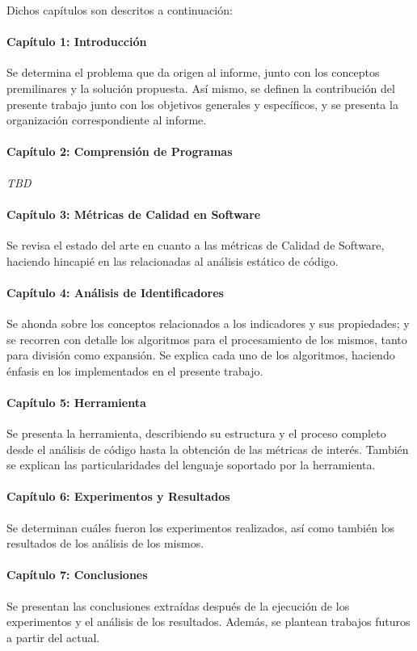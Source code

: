 Dichos capítulos son descritos a continuación:

\paragraph[]{Capítulo 1: Introducción} Se determina el problema que da origen al informe,
junto con los conceptos premilinares y la solución propuesta.
Así mismo, se definen la contribución del presente trabajo junto con los objetivos generales
y específicos, y se presenta la organización correspondiente al informe.

\paragraph[]{Capítulo 2: Comprensión de Programas} \textit{TBD}

\paragraph[]{Capítulo 3: Métricas de Calidad en Software} Se revisa el estado del arte
en cuanto a las métricas de Calidad de Software, haciendo hincapié en las relacionadas al análisis
estático de código.

\paragraph[]{Capítulo 4: Análisis de Identificadores} Se ahonda sobre los conceptos relacionados
a los indicadores y sus propiedades; y se recorren con detalle los algoritmos para el procesamiento
de los mismos, tanto para división como expansión.
Se explica cada uno de los algoritmos, haciendo énfasis en los implementados en el presente trabajo.

\paragraph[]{Capítulo 5: Herramienta} Se presenta la herramienta, describiendo su estructura y
el proceso completo desde el análisis de código hasta la obtención de las métricas de interés.
También se explican las particularidades del lenguaje soportado por la herramienta.

\paragraph[]{Capítulo 6: Experimentos y Resultados} Se determinan cuáles fueron los experimentos
realizados, así como también los resultados de los análisis de los mismos.

\paragraph[]{Capítulo 7: Conclusiones} Se presentan las conclusiones extraídas 
después de la ejecución de los experimentos y el análisis de los resultados.
Además, se plantean trabajos futuros a partir del actual.
